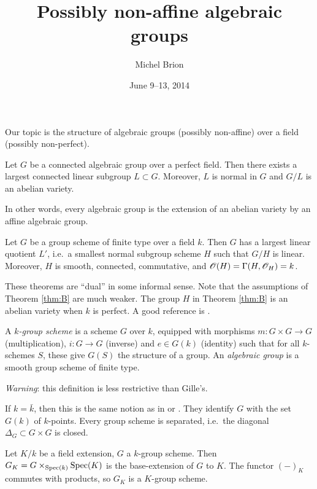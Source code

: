 \documentclass{article}
\title{Possibly non-affine algebraic groups}
\author{Michel Brion}
\date{June 9--13, 2014}
\begin{document}
\maketitle





Our topic is the structure of algebraic groups (possibly non-affine) over 
a field (possibly non-perfect). 

\begin{theorem}
Let $G$ be a connected algebraic group over a perfect field. Then there exists 
a largest connected linear subgroup $L\subset G$. Moreover, $L$ is normal 
in $G$ and $G/L$ is an abelian variety. 
\end{theorem}

In other words, every algebraic group is the extension of an abelian variety by 
an affine algebraic group. 

\begin{theorem}\label{thm:B}
Let $G$ be a group scheme of finite type over a field $k$. Then $G$ has a 
largest linear quotient $L'$, i.e.~a smallest normal subgroup scheme $H$ such 
that $G/H$ is linear. Moreover, $H$ is smooth, connected, commutative, and 
$\mathscr{O}(H) = \Gamma(H,\mathscr{O}_H) = k$. 
\end{theorem}

These theorems are ``dual'' in some informal sense. Note that the assumptions 
of Theorem \ref{thm:B} are much weaker. The group $H$ in Theorem \ref{thm:B} 
is an abelian variety when $k$ is perfect. 
A good reference is \cite{m14}. 

\begin{definition}
A \emph{$k$-group scheme} is a scheme $G$ over $k$, equipped with morphisms 
$m:G\times G\to G$ (multiplication), $i:G\to G$ (inverse) and 
$e\in G(k)$ (identity) such that for all $k$-schemes $S$, these give 
$G(S)$ the structure of a group. An \emph{algebraic group} is a smooth group 
scheme of finite type. 
\end{definition}

\emph{Warning}: this definition is less restrictive than Gille's. 

If $k=\bar k$, then this is the same notion as in \cite{b91} or \cite{s09}. 
They identify $G$ with the set $G(k)$ of $k$-points. 
Every group scheme is separated, i.e.\ the diagonal $\Delta_G\subset G\times G$ 
is closed. 

Let $K/k$ be a field extension, $G$ a $k$-group scheme. Then 
$G_K=G\times_{\operatorname{Spec}(k)} \operatorname{Spec}(K)$ is the base-extension of $G$ to 
$K$. The functor $(-)_K$ commutes with products, so $G_K$ is a $K$-group 
scheme. 
\end{document}
